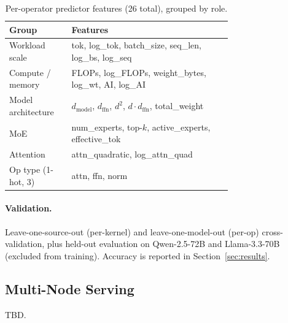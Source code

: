 \begin{table}[h]
\caption{Per-operator predictor features (26 total), grouped by role.}
\label{tab:features_l2}
\centering
\small
\begin{tabular}{@{}lp{0.72\linewidth}@{}}
\toprule
\textbf{Group} & \textbf{Features} \\
\midrule
Workload scale & tok, log\_tok, batch\_size, seq\_len, log\_bs, log\_seq \\
Compute / memory & FLOPs, log\_FLOPs, weight\_bytes, log\_wt, AI, log\_AI \\
Model architecture & $d_\text{model}$, $d_\text{ffn}$, $d^2$, $d{\cdot}d_\text{ffn}$, total\_weight \\
MoE & num\_experts, top-$k$, active\_experts, effective\_tok \\
Attention & attn\_quadratic, log\_attn\_quad \\
Op type (1-hot, 3) & attn, ffn, norm \\
\bottomrule
\end{tabular}
\end{table}

\paragraph{Validation.} Leave-one-source-out (per-kernel) and leave-one-model-out (per-op) cross-validation, plus held-out evaluation on Qwen-2.5-72B and Llama-3.3-70B (excluded from training). Accuracy is reported in Section~\ref{sec:results}.

\subsection{Multi-Node Serving}
\label{sec:multinode}

TBD.

\FloatBarrier
